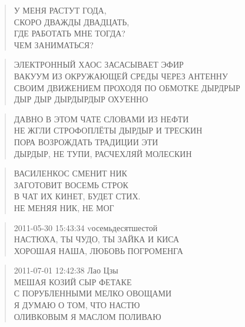 \poemtitle{***}
\begin{verse}
У МЕНЯ РАСТУТ ГОДА,\\
СКОРО ДВАЖДЫ ДВАДЦАТЬ,\\
ГДЕ РАБОТАТЬ МНЕ ТОГДА?\\
ЧЕМ ЗАНИМАТЬСЯ?
\end{verse}

\poemtitle{***}
\begin{verse}
ЭЛЕКТРОННЫЙ ХАОС ЗАСАСЫВАЕТ ЭФИР\\
ВАКУУМ ИЗ ОКРУЖАЮЩЕЙ СРЕДЫ ЧЕРЕЗ АНТЕННУ\\
СВОИМ ДВИЖЕНИЕМ ПРОХОДЯ ПО ОБМОТКЕ ДЫРДРЫР\\
ДЫР ДЫР ДЫРДЫРДЫР ОХУЕННО
\end{verse}

\poemtitle{***}
\begin{verse}
ДАВНО В ЭТОМ ЧАТЕ СЛОВАМИ ИЗ НЕФТИ\\
НЕ ЖГЛИ СТРОФОПЛЁТЫ ДЫРДЫР И ТРЕСКИН\\
ПОРА ВОЗРОЖДАТЬ ТРАДИЦИИ ЭТИ\\
ДЫРДЫР, НЕ ТУПИ, РАСЧЕХЛЯЙ МОЛЕСКИН
\end{verse}

\poemtitle{***}
\begin{verse}
ВАСИЛЕНКОС СМЕНИТ НИК\\
ЗАГОТОВИТ ВОСЕМЬ СТРОК\\
В ЧАТ ИХ КИНЕТ, БУДЕТ СТИХ.\\
НЕ МЕНЯЯ НИК, НЕ МОГ
\end{verse}

\poemtitle{***}
\begin{verse}
2011-05-30 15:43:34 vосемьдесятшестой\\
НАСТЮХА, ТЫ ЧУДО, ТЫ ЗАЙКА И КИСА\\
ХОРОШАЯ НАША, ЛЮБОВЬ ПОГРОМЕНГА
\end{verse}

\poemtitle{***}
\begin{verse}
2011-07-01 12:42:38 Лао Цзы\\
МЕШАЯ КОЗИЙ СЫР ФЕТАКЕ\\
С ПОРУБЛЕННЫМИ МЕЛКО ОВОЩАМИ\\
Я ДУМАЮ О ТОМ, ЧТО НАСТЮ\\
ОЛИВКОВЫМ Я МАСЛОМ ПОЛИВАЮ
\end{verse}

